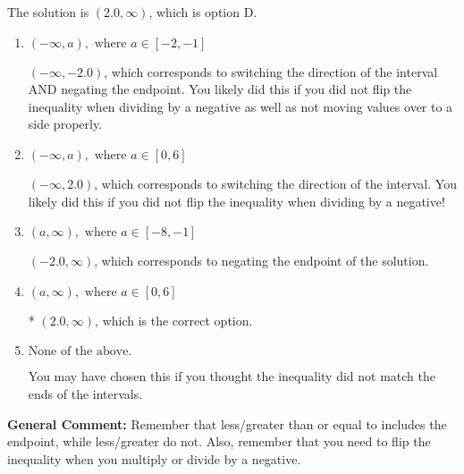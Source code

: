 \documentclass{extbook}[14pt]
\begin{document}
\begin{enumerate}
{The solution is \( (2.0, \infty) \), which is option D.\begin{enumerate}[label=\Alph*.]
\item \( (-\infty, a), \text{ where } a \in [-2, -1] \)

 $(-\infty, -2.0)$, which corresponds to switching the direction of the interval AND negating the endpoint. You likely did this if you did not flip the inequality when dividing by a negative as well as not moving values over to a side properly.
\item \( (-\infty, a), \text{ where } a \in [0, 6] \)

 $(-\infty, 2.0)$, which corresponds to switching the direction of the interval. You likely did this if you did not flip the inequality when dividing by a negative!
\item \( (a, \infty), \text{ where } a \in [-8, -1] \)

 $(-2.0, \infty)$, which corresponds to negating the endpoint of the solution.
\item \( (a, \infty), \text{ where } a \in [0, 6] \)

* $(2.0, \infty)$, which is the correct option.
\item \( \text{None of the above}. \)

You may have chosen this if you thought the inequality did not match the ends of the intervals.
\end{enumerate}

\textbf{General Comment:} Remember that less/greater than or equal to includes the endpoint, while less/greater do not. Also, remember that you need to flip the inequality when you multiply or divide by a negative.
}
\end{enumerate}
\end{document}
